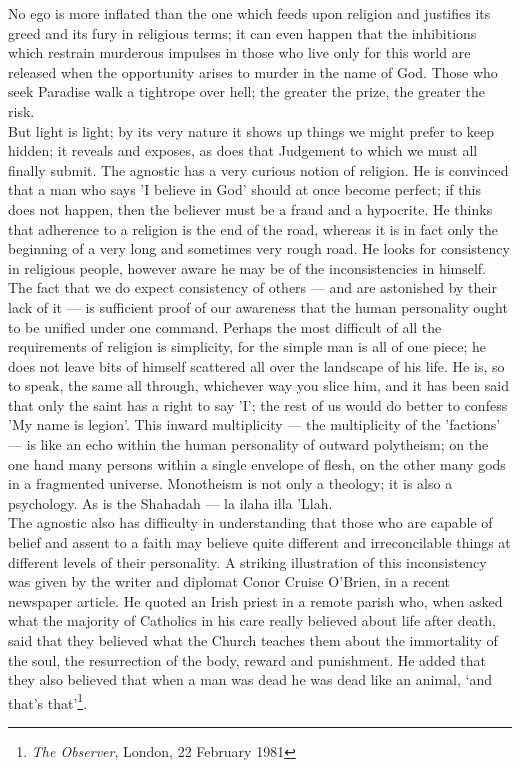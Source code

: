 \documentclass[10pt, twoside,openright]{book}
\begin{document}
No ego is more inflated than the one which feeds upon religion and justifies its greed and its fury 
in religious terms; it can even happen that the inhibitions which restrain murderous impulses in 
those who live only for this world are released when the opportunity arises to murder in the name of 
God. Those who seek Paradise walk a tightrope over hell; the greater the prize, the greater the risk. \\

But light is light; by its very nature it shows up things we might prefer to keep hidden; it reveals 
and exposes, as does that Judgement to which we must all finally submit. The agnostic has a very 
curious notion of religion. He is convinced that a man who says 'I believe in God' should at once 
become perfect; if this does not happen, then the believer must be a fraud and a hypocrite. He thinks 
that adherence to a religion is the end of the road, whereas it is in fact only the beginning of a 
very long and sometimes very rough road. He looks for consistency in religious people, however aware 
he may be of the inconsistencies in himself. \\

The fact that we do expect consistency of others --- and are astonished by their lack of it --- is 
sufficient proof of our awareness that the human personality ought to be unified under one command. 
Perhaps the most difficult of all the requirements of religion is simplicity, for the simple man is 
all of one piece; he does not leave bits of himself scattered all over the landscape of his life. He 
is, so to speak, the same all through, whichever way you slice him, and it has been said that only 
the saint has a right to say 'I'; the rest of us would do better to confess 'My name is legion'. This 
inward multiplicity --- the multiplicity of the 'factions' --- is like an echo within the human 
personality of outward polytheism; on the one hand many persons within a single envelope of flesh, on 
the other many gods in a fragmented universe. Monotheism is not only a theology; it is also a 
psychology. As is the Shahadah --- la ilaha illa 'Llah. \\

The agnostic also has difficulty in understanding that those who are capable of belief and assent to 
a faith may believe quite different and irreconcilable things at different levels of their 
personality. A striking illustration of this inconsistency was given by the writer and diplomat Conor 
Cruise O'Brien, in a recent newspaper article. He quoted an Irish priest in a remote parish who, when 
asked what the majority of Catholics in his care really believed about life after death, said that 
they believed what the Church teaches them about the immortality of the soul, the resurrection of the 
body, reward and punishment. He added that they also believed that when a man was dead he was dead 
like an animal, `and that's that'\footnote{\emph{The Observer}, London, 22 February 1981}.\\
\end{document}
